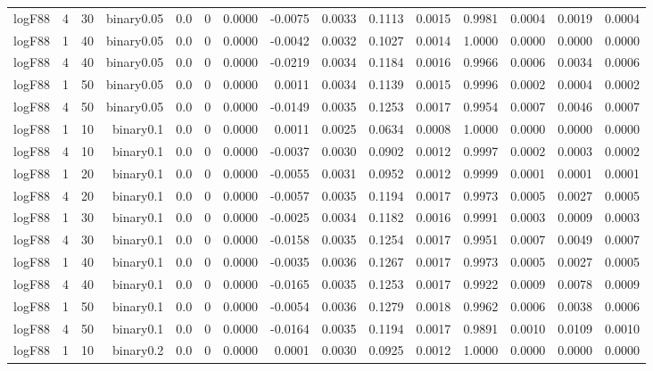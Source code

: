 \begin{longtable}{rrrrrrrrrrrrrrr}
  logF88 & 4 & 30 & binary0.05 & 0.0 & 0 & 0.0000 & -0.0075 & 0.0033 & 0.1113 & 0.0015 & 0.9981 & 0.0004 & 0.0019 & 0.0004 \\ 
  logF88 & 1 & 40 & binary0.05 & 0.0 & 0 & 0.0000 & -0.0042 & 0.0032 & 0.1027 & 0.0014 & 1.0000 & 0.0000 & 0.0000 & 0.0000 \\ 
  logF88 & 4 & 40 & binary0.05 & 0.0 & 0 & 0.0000 & -0.0219 & 0.0034 & 0.1184 & 0.0016 & 0.9966 & 0.0006 & 0.0034 & 0.0006 \\ 
  logF88 & 1 & 50 & binary0.05 & 0.0 & 0 & 0.0000 & 0.0011 & 0.0034 & 0.1139 & 0.0015 & 0.9996 & 0.0002 & 0.0004 & 0.0002 \\ 
  logF88 & 4 & 50 & binary0.05 & 0.0 & 0 & 0.0000 & -0.0149 & 0.0035 & 0.1253 & 0.0017 & 0.9954 & 0.0007 & 0.0046 & 0.0007 \\ 
  logF88 & 1 & 10 & binary0.1 & 0.0 & 0 & 0.0000 & 0.0011 & 0.0025 & 0.0634 & 0.0008 & 1.0000 & 0.0000 & 0.0000 & 0.0000 \\ 
  logF88 & 4 & 10 & binary0.1 & 0.0 & 0 & 0.0000 & -0.0037 & 0.0030 & 0.0902 & 0.0012 & 0.9997 & 0.0002 & 0.0003 & 0.0002 \\ 
  logF88 & 1 & 20 & binary0.1 & 0.0 & 0 & 0.0000 & -0.0055 & 0.0031 & 0.0952 & 0.0012 & 0.9999 & 0.0001 & 0.0001 & 0.0001 \\ 
  logF88 & 4 & 20 & binary0.1 & 0.0 & 0 & 0.0000 & -0.0057 & 0.0035 & 0.1194 & 0.0017 & 0.9973 & 0.0005 & 0.0027 & 0.0005 \\ 
  logF88 & 1 & 30 & binary0.1 & 0.0 & 0 & 0.0000 & -0.0025 & 0.0034 & 0.1182 & 0.0016 & 0.9991 & 0.0003 & 0.0009 & 0.0003 \\ 
  logF88 & 4 & 30 & binary0.1 & 0.0 & 0 & 0.0000 & -0.0158 & 0.0035 & 0.1254 & 0.0017 & 0.9951 & 0.0007 & 0.0049 & 0.0007 \\ 
  logF88 & 1 & 40 & binary0.1 & 0.0 & 0 & 0.0000 & -0.0035 & 0.0036 & 0.1267 & 0.0017 & 0.9973 & 0.0005 & 0.0027 & 0.0005 \\ 
  logF88 & 4 & 40 & binary0.1 & 0.0 & 0 & 0.0000 & -0.0165 & 0.0035 & 0.1253 & 0.0017 & 0.9922 & 0.0009 & 0.0078 & 0.0009 \\ 
  logF88 & 1 & 50 & binary0.1 & 0.0 & 0 & 0.0000 & -0.0054 & 0.0036 & 0.1279 & 0.0018 & 0.9962 & 0.0006 & 0.0038 & 0.0006 \\ 
  logF88 & 4 & 50 & binary0.1 & 0.0 & 0 & 0.0000 & -0.0164 & 0.0035 & 0.1194 & 0.0017 & 0.9891 & 0.0010 & 0.0109 & 0.0010 \\ 
  logF88 & 1 & 10 & binary0.2 & 0.0 & 0 & 0.0000 & 0.0001 & 0.0030 & 0.0925 & 0.0012 & 1.0000 & 0.0000 & 0.0000 & 0.0000 \\ 

\end{longtable}

